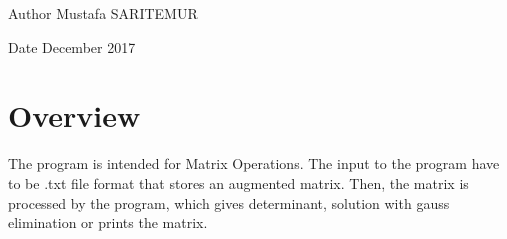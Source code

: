 \begin{DoxyAuthor}{Author}
Mustafa S\+A\+R\+I\+T\+E\+M\+UR 
\end{DoxyAuthor}
\begin{DoxyDate}{Date}
December 2017
\end{DoxyDate}
\hypertarget{index_intro_sec}{}\section{Overview}\label{index_intro_sec}
The program is intended for Matrix Operations. The input to the program have to be .txt file format that stores an augmented matrix. Then, the matrix is processed by the program, which gives determinant, solution with gauss elimination or prints the matrix. 